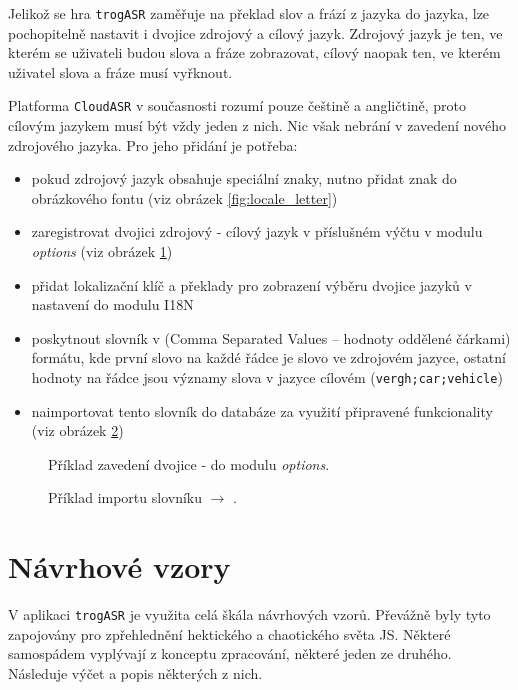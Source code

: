 Jelikož se hra \verb|trogASR| zaměřuje na překlad slov a frází z jazyka do jazyka, lze pochopitelně nastavit i dvojice zdrojový a cílový jazyk. Zdrojový jazyk je ten, ve kterém se uživateli budou slova a fráze zobrazovat, cílový naopak ten, ve kterém uživatel slova a fráze musí vyřknout.

Platforma \verb|CloudASR| v současnosti rozumí pouze češtině a angličtině, proto cílovým jazykem musí být vždy jeden z nich. Nic však nebrání v zavedení nového zdrojového jazyka. Pro jeho přidání je potřeba:

\begin{itemize}
\item pokud zdrojový jazyk obsahuje speciální znaky, nutno přidat znak do obrázkového fontu (viz obrázek \ref{fig:locale_letter})
\item zaregistrovat dvojici zdrojový - cílový jazyk v příslušném výčtu v modulu {\sl options} (viz obrázek \ref{fig:locale_options})
\item přidat lokalizační klíč a překlady pro zobrazení výběru dvojice jazyků v nastavení do modulu I18N
\item poskytnout slovník v  (Comma Separated Values -- hodnoty oddělené čárkami) formátu, kde první slovo na každé řádce je slovo ve zdrojovém jazyce, ostatní hodnoty na řádce jsou významy slova v jazyce cílovém (\verb|vergh;car;vehicle|)
\item naimportovat tento slovník do databáze za využití připravené funkcionality (viz obrázek \ref{fig:locale_import})
\end{itemize}

\begin{figure}[h]
	
	\caption{Příklad zavedení dvojice  -  do modulu {\sl options}.}
	\label{fig:locale_options}
\end{figure}

\begin{figure}[h]
	
	\caption{Příklad importu slovníku  $\rightarrow$ .}
	\label{fig:locale_import}
\end{figure}

\section{Návrhové vzory}

V aplikaci \verb|trogASR| je využita celá škála návrhových vzorů. Převážně byly tyto zapojovány pro zpřehlednění hektického a chaotického světa JS. Některé samospádem vyplývají z konceptu zpracování, některé jeden ze druhého. Následuje výčet a popis některých z nich.

